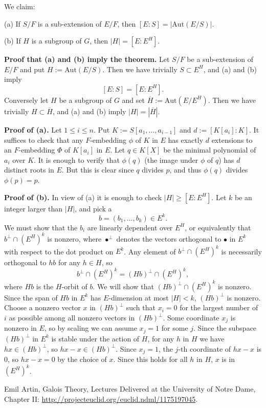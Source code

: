 \documentclass[12pt]{article}
\newcommand{\nn}{\noindent}
\newcommand{\so}{\bigskip}
\begin{document}
\nn We claim:  

(a) If $S/F$ is a sub-extension of $E/F$, then $[E:S]=|\text{Aut}(E/S)|$.  

(b) If $H$ is a subgroup of $G$, then $|H|=[E:E^H]$.  

\nn\textbf{Proof that (a) and (b) imply the theorem.} Let $S/F$ be a sub-extension of $E/F$ and put $H:=\text{Aut}(E/S)$. Then we have trivially $S\subset E^H$, and (a) and (b) imply 
$$
[E:S]=[E:E^H].
$$
Conversely let $H$ be a subgroup of $G$ and set $\overline H:=\text{Aut}(E/E^H)$. Then we have trivially $H\subset\overline H$, and (a) and (b) imply $|H|=|\overline H|$.

\nn\textbf{Proof of (a).} Let $1\le i\le n$. Put $K:=S[a_1,\dots,a_{i-1}]$ and $d:=[K[a_i]:K]$. It suffices to check that any $F$-embedding $\phi$ of $K$ in $E$ has exactly $d$ extensions to an $F$-embedding $\Phi$ of $K[a_i]$ in $E$. Let $q\in K[X]$ be the minimal polynomial of $a_i$ over $K$. It is enough to verify that $\phi(q)$ (the image under $\phi$ of $q$) has $d$ distinct roots in $E$. But this is clear since $q$ divides $p$, and thus $\phi(q)$ divides $\phi(p)=p$.

\nn\textbf{Proof of (b).} In view of (a) it is enough to check $|H|\ge[E:E^H]$. Let $k$ be an integer larger than $|H|$, and pick a 
$$
b=(b_1,\dots,b_k)\in E^k.
$$
We must show that the $b_i$ are linearly dependent over $E^H$, or equivalently that $b^\perp\cap(E^H)^k$ is nonzero, where $\bullet^\perp$ denotes the vectors orthogonal to $\bullet$ in $E^k$ with respect to the dot product on $E^k$. Any element of $b^\perp\cap (E^H)^k$ is necessarily orthogonal to $hb$ for any $h\in H$, so 
$$
b^\perp\cap(E^H)^k=(Hb)^\perp\cap(E^H)^k,
$$ 
where $Hb$ is the $H$-orbit of $b$. We will show that $(Hb)^\perp\cap(E^H)^k$ is nonzero. Since the span of $Hb$ in $E^k$ has $E$-dimension at most $|H|<k$, $(Hb)^\perp$ is nonzero. Choose a nonzero vector $x$ in $(Hb)^\perp$ such that $x_i=0$ for the largest number of $i$ as possible among all nonzero vectors in $(Hb)^\perp$. Some coordinate $x_j$ is nonzero in $E$, so by scaling we can assume $x_j=1$ for some $j$. Since the subspace $(Hb)^\perp$ in $E^k$ is stable under the action of $H$, for any $h$ in $H$ we have $hx \in(Hb)^\perp$, so $hx-x\in(Hb)^\perp$. Since $x_j=1$, the $j$-th coordinate of $hx-x$ is $0$, so $hx-x=0$ by the choice of $x$. Since this holds for all $h$ in $H$, $x$ is in $(E^H)^k$.\so

\nn[A] Emil Artin, Galois Theory, Lectures Delivered at the University of Notre Dame, Chapter II: 
\href{http://projecteuclid.org/euclid.ndml/1175197045}{http://projecteuclid.org/euclid.ndml/1175197045}. 
\end{document}
